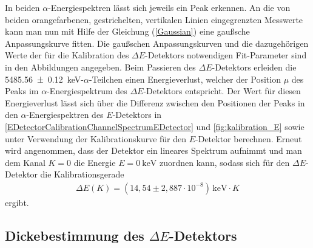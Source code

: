 In beiden $\alpha$-Energiespektren lässt sich jeweils ein Peak erkennen.
An die von beiden orangefarbenen, gestrichelten, vertikalen Linien eingegrenzten Messwerte kann man nun mit Hilfe der Gleichung (\ref{Gaussian}) eine gaußsche Anpassungskurve fitten.
Die gaußschen Anpassungskurven und die dazugehörigen Werte der für die Kalibration des $\Delta E$-Detektors notwendigen Fit-Parameter sind in den Abbildungen angegeben.
Beim Passieren des $\Delta E$-Detektors erleiden die \SI{5485,56 +- 0,12}{\kilo\electronvolt}-$\alpha$-Teilchen einen Energieverlust, welcher der Position $\mu$ des Peaks im $\alpha$-Energiespektrum des $\Delta E$-Detektors entspricht.
Der Wert für diesen Energieverlust lässt sich über die Differenz zwischen den Positionen der Peaks in den $\alpha$-Energiespektren des $E$-Detektors in \cref{EDetectorCalibrationChannelSpectrumEDetector} und \ref{fig:kalibration_E} sowie unter Verwendung der Kalibrationskurve für den $E$-Detektor berechnen.
Erneut wird angenommen, dass der Detektor ein lineares Spektrum aufnimmt und man dem Kanal $K=\num{0}$ die Energie $E=\SI{0}{\kilo\electronvolt}$ zuordnen kann, sodass sich für den $\Delta E$-Detektor die Kalibrationsgerade
\begin{align}
\Delta E(K) = (14,54\pm 2,887\cdot 10^{-8})\,\text{keV} \cdot K
\end{align}
ergibt.

\subsection{Dickebestimmung des $\Delta E$-Detektors} \label{sec:de_kalibration}

